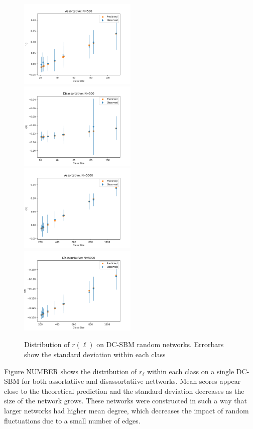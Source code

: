 \documentclass[12pt]{article}
\begin{document}
\begin{figure}[h!]
\includegraphics[width=0.5\textwidth]{assortative_N_500.png}
\includegraphics[width=0.5\textwidth]{disassortative_N_500.png}
\includegraphics[width=0.5\textwidth]{assortative_N_5000.png}
\includegraphics[width=0.5\textwidth]{disassortative_N_5000.png}
\caption{Distribution of $r(\ell)$ on DC-SBM random networks.  Errorbars show the standard deviation within each class}
\end{figure}

Figure NUMBER shows the distribution of $r_\ell$ within each class on a single DC-SBM for both assortatiive and disassortatiive nettworks.  Mean scores appear close to the theoretical prediction and the standard deviation decreases as the size of the network grows.  These networks were constructed in such a way that larger networks had higher mean degree, which decreases the impact of random fluctuations due to a small number of edges.  
\end{document}
